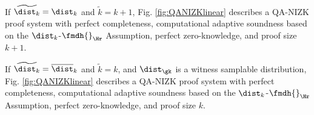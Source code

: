\begin{theorem} If $\widetilde{\dist_{k}}=\dist_k$ and $\tilde{k}=k+1$,  Fig. \ref{fig:QANIZKlinear} describes a QA-NIZK
proof system with perfect completeness, computational adaptive soundness based on the  $\dist_{k}$-$\fmdh{}_{\Hr}$ Assumption, perfect zero-knowledge, and proof size $k+1$. 
\label{theo:qanizk1}
\end{theorem}

\begin{theorem} If $\widetilde{\dist_{k}}=\overline{\dist}_k$ and $\tilde{k}=k$,  and $\dist_{\gk}$ is a witness samplable distribution, Fig. \ref{fig:QANIZKlinear} describes a QA-NIZK
proof system with perfect completeness, computational adaptive soundness based on the  $\dist_{k}$-$\fmdh{}_{\Hr}$ Assumption, perfect zero-knowledge, and proof size $k$. 
\label{theo:qanizk2}
\end{theorem}

